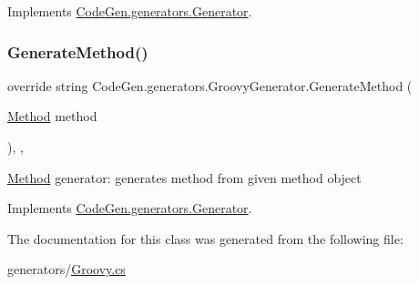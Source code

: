 Implements \mbox{\hyperlink{classCodeGen_1_1generators_1_1Generator_a0d1a48aedbca08c05af734a43739d1c3}{Code\+Gen.\+generators.\+Generator}}.

\mbox{\label{classCodeGen_1_1generators_1_1GroovyGenerator_a7c8d2446310971e10a24b802bd9c62a0}} 
\subsubsection{\texorpdfstring{Generate\+Method()}{GenerateMethod()}}
{\footnotesize\ttfamily override string Code\+Gen.\+generators.\+Groovy\+Generator.\+Generate\+Method (\begin{DoxyParamCaption}\item[{\mbox{\hyperlink{classCodeGen_1_1generators_1_1Method}{Method}}}]{method }\end{DoxyParamCaption})\hspace{0.3cm}{\ttfamily [inline]}, {\ttfamily [protected]}, {\ttfamily [virtual]}}



\mbox{\hyperlink{classCodeGen_1_1generators_1_1Method}{Method}} generator\+: generates method from given method object  



Implements \mbox{\hyperlink{classCodeGen_1_1generators_1_1Generator_a04fc9bd217b3b8c3d5f7b1a3f92c79d3}{Code\+Gen.\+generators.\+Generator}}.



The documentation for this class was generated from the following file\+:\begin{DoxyCompactItemize}
\item 
generators/\mbox{\hyperlink{Groovy_8cs}{Groovy.\+cs}}\end{DoxyCompactItemize}
